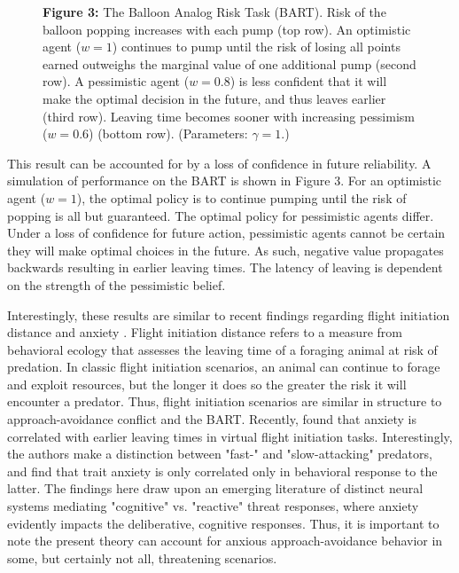 \documentclass[11pt]{article} %
\begin{document}
\begin{figure}
  \centerline{%
  }
  \par \textbf{Figure 3:} The Balloon Analog Risk Task (BART). Risk of the balloon popping increases with each pump (top row). An optimistic agent ($w=1$) continues to pump until the risk of losing all points earned outweighs the marginal value of one additional pump (second row). A pessimistic agent ($w=0.8$) is less confident that it will make the optimal decision in the future, and thus leaves earlier (third row). Leaving time becomes sooner with increasing pessimism ($w=0.6$) (bottom row). (Parameters: $\gamma = 1$.)
\end{figure}

This result can be accounted for by a loss of confidence in future reliability. A simulation of performance on the BART is shown in Figure 3. For an optimistic agent ($w=1$), the optimal policy is to continue pumping until the risk of popping is all but guaranteed. The optimal policy for pessimistic agents differ. Under a loss of confidence for future action, pessimistic agents cannot be certain they will make optimal choices in the future. As such, negative value propagates backwards resulting in earlier leaving times. The latency of leaving is dependent on the strength of the pessimistic belief.

Interestingly, these results are similar to recent findings regarding flight initiation distance and anxiety \citep{Mobbs2018, Mobbs2019}. Flight initiation distance refers to a measure from behavioral ecology that assesses the leaving time of a foraging animal at risk of predation. In classic flight initiation scenarios, an animal can continue to forage and exploit resources, but the longer it does so the greater the risk it will encounter a predator. Thus, flight initiation scenarios are similar in structure to approach-avoidance conflict and the BART. Recently, \cite{Mobbs2019} found that anxiety is correlated with earlier leaving times in virtual flight initiation tasks. Interestingly, the authors make a distinction between "fast-" and "slow-attacking" predators, and find that trait anxiety is only correlated only in behavioral response to the latter. The findings here draw upon an emerging literature of distinct neural systems mediating "cognitive" vs. "reactive" threat responses, where anxiety evidently impacts the deliberative, cognitive responses. Thus, it is important to note the present theory can account for anxious approach-avoidance behavior in some, but certainly not all, threatening scenarios.
\end{document}
